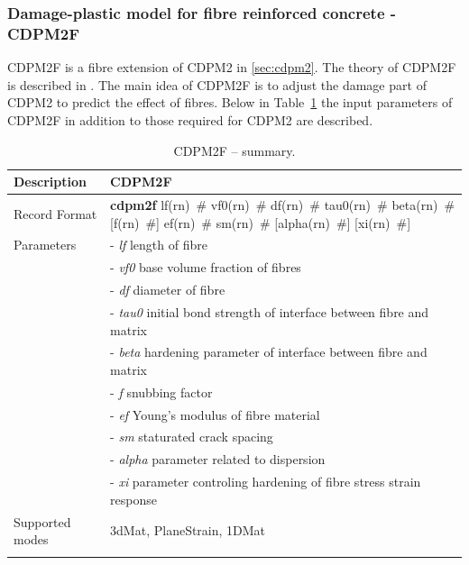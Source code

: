 \documentclass[a4paper]{article}
\newcommand{\descitem}[1]{{\noindent \bf #1}}
\newcommand{\elemparam}[2]{{{#1\tiny (#2)}~\#}}
\newcommand{\param}[1]{{\it #1}}
\newenvironment{mmt}{\begin{tabular}{|l|p{9cm}|}}{\end{tabular}\\}
\newenvironment{mmt}{\begin{tabular}{|l|l|}}{\end{tabular}\\}
\begin{document}
\subsubsection{Damage-plastic model for fibre reinforced concrete - CDPM2F}
CDPM2F is a fibre extension of CDPM2 in \ref{sec:cdpm2}. The theory of CDPM2F is described in \cite{ZhoMarGra24}.
The main idea of CDPM2F is to adjust the damage part of CDPM2 to predict the effect of fibres.
Below in Table~\ref{cdpm2f_table} the input parameters of CDPM2F in addition to those required for CDPM2 are described. 

\begin{longtable}{|l|p{9cm}|}
\hline
Description & CDPM2F\\
\hline
Record Format & \descitem{cdpm2f} \elemparam{lf}{rn} \elemparam{vf0}{rn} \elemparam{df}{rn} \elemparam{tau0}{rn} \elemparam{beta}{rn} [\elemparam{f}{rn}] \elemparam{ef}{rn} \elemparam{sm}{rn} [\elemparam{alpha}{rn}] [\elemparam{xi}{rn}]\\
Parameters &- \param{lf} length of fibre\\
&- \param{vf0} base volume fraction of fibres\\
&- \param{df} diameter of fibre\\
&- \param{tau0} initial bond strength of interface between fibre and matrix\\
&- \param{beta} hardening parameter of interface between fibre and matrix\\
&- \param{f} snubbing factor\\
&- \param{ef} Young's modulus of fibre material\\
&- \param{sm}  staturated crack spacing\\
&- \param{alpha} parameter related to dispersion\\
&- \param{xi}  parameter controling hardening of fibre stress strain response\\
Supported modes& 3dMat, PlaneStrain, 1DMat\\
\hline
\caption{CDPM2F -- summary.}
\label{cdpm2f_table}
\end{longtable}
\end{document}
